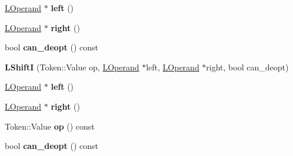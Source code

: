 \begin{DoxyCompactItemize}
\item 
\hyperlink{classv8_1_1internal_1_1_l_operand}{L\+Operand} $\ast$ {\bfseries left} ()\hypertarget{classv8_1_1internal_1_1_l_shift_i_a5ef728d134ab0ae5565b90793364add0}{}\label{classv8_1_1internal_1_1_l_shift_i_a5ef728d134ab0ae5565b90793364add0}

\item 
\hyperlink{classv8_1_1internal_1_1_l_operand}{L\+Operand} $\ast$ {\bfseries right} ()\hypertarget{classv8_1_1internal_1_1_l_shift_i_a728880e17b20375b612e631dcc13dc3e}{}\label{classv8_1_1internal_1_1_l_shift_i_a728880e17b20375b612e631dcc13dc3e}

\item 
bool {\bfseries can\+\_\+deopt} () const \hypertarget{classv8_1_1internal_1_1_l_shift_i_abbbf228b7c1516e1e419ef9ffbcc97b6}{}\label{classv8_1_1internal_1_1_l_shift_i_abbbf228b7c1516e1e419ef9ffbcc97b6}

\item 
{\bfseries L\+ShiftI} (Token\+::\+Value op, \hyperlink{classv8_1_1internal_1_1_l_operand}{L\+Operand} $\ast$left, \hyperlink{classv8_1_1internal_1_1_l_operand}{L\+Operand} $\ast$right, bool can\+\_\+deopt)\hypertarget{classv8_1_1internal_1_1_l_shift_i_adaac229c54d2a924ac68d595fc30703a}{}\label{classv8_1_1internal_1_1_l_shift_i_adaac229c54d2a924ac68d595fc30703a}

\item 
\hyperlink{classv8_1_1internal_1_1_l_operand}{L\+Operand} $\ast$ {\bfseries left} ()\hypertarget{classv8_1_1internal_1_1_l_shift_i_a5ef728d134ab0ae5565b90793364add0}{}\label{classv8_1_1internal_1_1_l_shift_i_a5ef728d134ab0ae5565b90793364add0}

\item 
\hyperlink{classv8_1_1internal_1_1_l_operand}{L\+Operand} $\ast$ {\bfseries right} ()\hypertarget{classv8_1_1internal_1_1_l_shift_i_a728880e17b20375b612e631dcc13dc3e}{}\label{classv8_1_1internal_1_1_l_shift_i_a728880e17b20375b612e631dcc13dc3e}

\item 
Token\+::\+Value {\bfseries op} () const \hypertarget{classv8_1_1internal_1_1_l_shift_i_af3e3cecd04a31cf7df5a66653f6c009d}{}\label{classv8_1_1internal_1_1_l_shift_i_af3e3cecd04a31cf7df5a66653f6c009d}

\item 
bool {\bfseries can\+\_\+deopt} () const \hypertarget{classv8_1_1internal_1_1_l_shift_i_abbbf228b7c1516e1e419ef9ffbcc97b6}{}\label{classv8_1_1internal_1_1_l_shift_i_abbbf228b7c1516e1e419ef9ffbcc97b6}


\end{DoxyCompactItemize}
